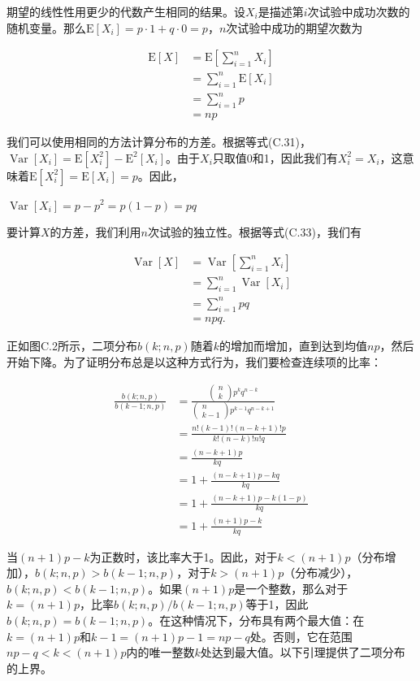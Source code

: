 \documentclass[lang=cn,newtx,10pt,scheme=chinese]{elegantbook}
\begin{document}
期望的线性性用更少的代数产生相同的结果。设$X_i$是描述第$i$次试验中成功次数的随机变量。那么$\mathrm{E}[X_i]=p \cdot 1+q \cdot 0=p$，$n$次试验中成功的期望次数为

$$
\begin{aligned}
\mathrm{E}[X] & =\mathrm{E}[\sum_{i=1}^n X_i] \\
& =\sum_{i=1}^n \mathrm{E}[X_i] \\
& =\sum_{i=1}^n p \\
& =n p
\end{aligned}
$$

我们可以使用相同的方法计算分布的方差。根据等式(C.31)，$\operatorname{Var}[X_i]=\mathrm{E}[X_i^2]-\mathrm{E}^2[X_i]$。由于$X_i$只取值0和1，因此我们有$X_i^2=X_i$，这意味着$\mathrm{E}[X_i^2]=\mathrm{E}[X_i]=p$。因此，

$\operatorname{Var}[X_i]=p-p^2=p(1-p)=p q$

要计算$X$的方差，我们利用$n$次试验的独立性。根据等式(C.33)，我们有

$$
\begin{aligned}
\operatorname{Var}[X] & =\operatorname{Var}[\sum_{i=1}^n X_i] \\
& =\sum_{i=1}^n \operatorname{Var}[X_i] \\
& =\sum_{i=1}^n p q \\
& =n p q .
\end{aligned}
$$

正如图C.2所示，二项分布$b(k; n, p)$随着$k$的增加而增加，直到达到均值$n p$，然后开始下降。为了证明分布总是以这种方式行为，我们要检查连续项的比率：

$$
\begin{aligned}
\frac{b(k ; n, p)}{b(k-1 ; n, p)} & =\frac{(\begin{array}{c}
n \\
k
\end{array}) p^k q^{n-k}}{(\begin{array}{c}
n \\
k-1
\end{array}) p^{k-1} q^{n-k+1}} \\
& =\frac{n !(k-1) !(n-k+1) ! p}{k !(n-k) ! n ! q} \\
& =\frac{(n-k+1) p}{k q} \\
& =1+\frac{(n-k+1) p-k q}{k q} \\
& =1+\frac{(n-k+1) p-k(1-p)}{k q} \\
& =1+\frac{(n+1) p-k}{k q}
\end{aligned}
$$

当$(n+1)p-k$为正数时，该比率大于1。因此，对于$k<(n+1)p$（分布增加），$b(k;n,p)>b(k-1;n,p)$，对于$k>(n+1)p$（分布减少），$b(k;n,p)<b(k-1;n,p)$。如果$(n+1)p$是一个整数，那么对于$k=(n+1)p$，比率$b(k;n,p)/b(k-1;n,p)$等于1，因此$b(k;n,p)=b(k-1;n,p)$。在这种情况下，分布具有两个最大值：在$k=(n+1)p$和$k-1=(n+1)p-1=n p-q$处。否则，它在范围$n p-q<k<(n+1)p$内的唯一整数$k$处达到最大值。以下引理提供了二项分布的上界。
\end{document}
